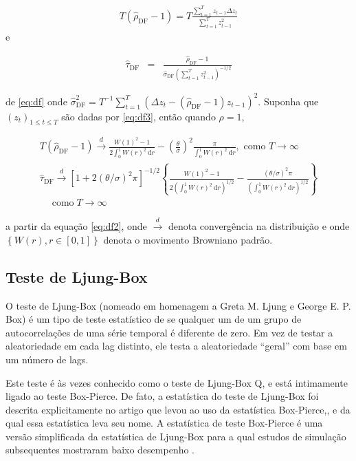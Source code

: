  
 \begin{eqnarray}
 	T\left(\hat{\rho}_{\mathrm{DF}}-1\right)=T \frac{\sum_{t=1}^T z_{t-1} \Delta z_t}{\sum_{t=1}^T z_{t-1}^2}
 \end{eqnarray}
 e
 
 
 \begin{eqnarray}
 	\hat{\tau}_{\mathrm{DF}}&=&\frac{\hat{\rho}_{\mathrm{DF}}-1}{\hat{\sigma}_{\mathrm{DF}}\left(\sum_{t=1}^T z_{t-1}^2\right)^{-1 / 2}} \label{eq:df}
 \end{eqnarray}
 
 \noindent de \eqref{eq:df} onde $\hat{\sigma}_{\mathrm{DF}}^2=T^{-1} \sum_{t=1}^T\left(\Delta z_t-\left(\hat{\rho}_{\mathrm{DF}}-1\right) z_{t-1}\right)^2 .$
 Suponha que $\left(z_t\right)_{1 \leq t \leq T}$ são dadas por \eqref{eq:df3}, então quando $\rho=1$,
 
 
 \begin{eqnarray}
 	T\left(\hat{\rho}_{\mathrm{DF}}-1\right) \stackrel{d}{\longrightarrow} \frac{W(1)^2-1}{2 \int_0^1 W(r)^2 \mathrm{~d} r}-\left(\frac{\theta}{\sigma}\right)^2 \frac{\pi}{\int_0^1 W(r)^2 \mathrm{~d} r}, \text { como } T \rightarrow \infty \\
 	\hat{\tau}_{\mathrm{DF}} \stackrel{d}{\longrightarrow}\left[1+2(\theta / \sigma)^2 \pi\right]^{-1 / 2}\left\{\frac{W(1)^2-1}{2\left(\int_0^1 W(r)^2 \mathrm{~d} r\right)^{1 / 2}}-\frac{(\theta / \sigma)^2 \pi}{\left(\int_0^1 W(r)^2 \mathrm{~d} r\right)^{1 / 2}}\right\} \\
 	\quad \operatorname{como} T \rightarrow \infty\label{eq:df2}
 \end{eqnarray}
 
 \noindent a partir da equação \eqref{eq:df2}, onde $\stackrel{d}{\longrightarrow}$ denota convergência na distribuição e onde $\left\{W(r), r \in[0,1]\right\}$ denota o movimento Browniano padrão.
 
 \subsection{Teste de Ljung-Box}
 
 O teste de Ljung-Box (nomeado em homenagem a Greta M. Ljung e George E. P. Box) é um tipo de teste estatístico de se qualquer um de um grupo de autocorrelações de uma série temporal é diferente de zero. Em vez de testar a aleatoriedade em cada lag distinto, ele testa a aleatoriedade ``geral'' com base em um número de lags.
 
 Este teste é às vezes conhecido como o teste de Ljung-Box Q, e está intimamente ligado ao teste Box-Pierce. De fato, a estatística do teste de Ljung-Box foi descrita explicitamente no artigo que levou ao uso da estatística Box-Pierce,\cite{box}, \cite{ljung} e da qual essa estatística leva seu nome. A estatística de teste Box-Pierce é uma versão simplificada da estatística de Ljung-Box para a qual estudos de simulação subsequentes mostraram baixo desempenho \cite{dav}.
 
